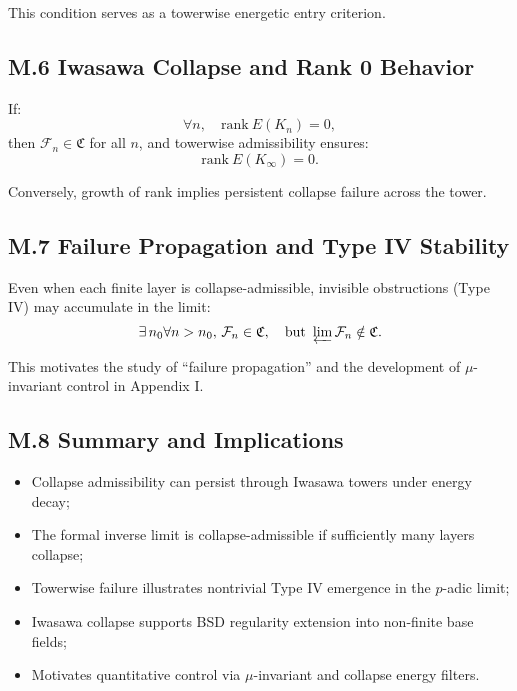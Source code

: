 \documentclass[11pt]{article}
\begin{document}
This condition serves as a towerwise energetic entry criterion.

\subsection*{M.6 Iwasawa Collapse and Rank 0 Behavior}

If:
\[
\forall n, \quad \mathrm{rank}~E(K_n) = 0,
\]
then \(\mathcal{F}_n \in \mathfrak{C}\) for all \( n \), and towerwise admissibility ensures:
\[
\mathrm{rank}~E(K_\infty) = 0.
\]

Conversely, growth of rank implies persistent collapse failure across the tower.

\subsection*{M.7 Failure Propagation and Type IV Stability}

Even when each finite layer is collapse-admissible, invisible obstructions (Type IV) may accumulate in the limit:
\[
\exists \, n_0 \forall n > n_0, \, \mathcal{F}_n \in \mathfrak{C}, \quad
\text{but } \varprojlim \mathcal{F}_n \notin \mathfrak{C}.
\]

This motivates the study of “failure propagation” and the development of \(\mu\)-invariant control in Appendix I.

\subsection*{M.8 Summary and Implications}

\begin{itemize}
  \item Collapse admissibility can persist through Iwasawa towers under energy decay;
  \item The formal inverse limit is collapse-admissible if sufficiently many layers collapse;
  \item Towerwise failure illustrates nontrivial Type IV emergence in the \( p \)-adic limit;
  \item Iwasawa collapse supports BSD regularity extension into non-finite base fields;
  \item Motivates quantitative control via \(\mu\)-invariant and collapse energy filters.
\end{itemize}



\appendix
\end{document}
